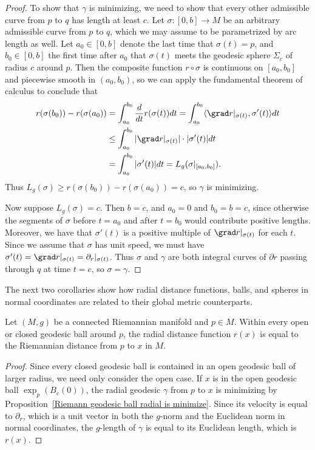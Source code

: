 \begin{proof}
To show that $\gamma$ is minimizing, we need to show that every other admissible curve from $p$ to $q$ has length at least $c$. Let $\sigma:[0,b]\to M$ be an arbitrary 
admissible curve from $p$ to $q$, which we may assume to be parametrized by arc length as well. Let $a_0\in[0,b]$ denote the last time that $\sigma(t)=p$, and $b_0\in[0,b]$ the first time after $a_0$ that $\sigma(t)$ meets the geodesic sphere $\Sigma_c$ of radius $c$ around $p$. Then the composite function $r\circ\sigma$ is continuous on $[a_0,b_0]$ and piecewise smooth in $(a_0,b_0)$, so we can apply the fundamental theorem of calculus to conclude that
\begin{equation}\label{Riemann geodesic ball minimize-1}
\begin{aligned}
r(\sigma(b_0))-r(\sigma(a_0))&=\int_{a_0}^{b_0}\frac{d}{dt}r(\sigma(t))dt=\int_{a_0}^{b_0}\langle\grad r|_{\sigma(t)},\sigma'(t)\rangle dt\\
&\leq\int_{a_0}^{b_0}|\grad r|_{\sigma(t)}|\cdot|\sigma'(t)|dt\\
&=\int_{a_0}^{b_0}|\sigma'(t)|dt=L_g(\sigma|_{[a_0,b_0]}).
\end{aligned}
\end{equation}
Thus $L_g(\sigma)\geq r(\sigma(b_0))-r(\sigma(a_0))=c$, so $\gamma$ is minimizing.\par
Now suppose $L_g(\sigma)=c$. Then $b=c$, and $a_0=0$ and $b_0=b=c$, since otherwise the segments of $\sigma$ before $t=a_0$ and after $t=b_0$ would contribute positive lengths. Moreover, we have that $\sigma'(t)$ is a positive multiple of $\grad r|_{\sigma(t)}$ for each $t$. Since we assume that $\sigma$ has unit speed, we must have $\sigma'(t)=\grad r|_{\sigma(t)}=\partial_r|_{\sigma(t)}$. Thus $\sigma$ and $\gamma$ are both integral curves of $\partial r$ passing through $q$ at time $t=c$, so $\sigma=\gamma$.
\end{proof}
The next two corollaries show how radial distance functions, balls, and spheres in normal coordinates are related to their global metric counterparts.
\begin{corollary}\label{Riemann distance is radial distance}
Let $(M,g)$ be a connected Riemannian manifold and $p\in M$. Within every open or closed geodesic ball around $p$, the radial distance function $r(x)$ is equal to the Riemannian distance from $p$ to $x$ in $M$.
\end{corollary}
\begin{proof}
Since every closed geodesic ball is contained in an open geodesic ball of larger radius, we need only consider the open case. If $x$ is in the open geodesic ball $\exp_p(B_c(0))$, the radial geodesic $\gamma$ from $p$ to $x$ is minimizing by Proposition~\ref{Riemann geodesic ball radial is minimize}. Since its velocity is equal to $\partial_r$, which is a unit vector in both the $g$-norm and the Euclidean norm in normal coordinates, the $g$-length of $\gamma$ is equal to its Euclidean length, which is $r(x)$.
\end{proof}
